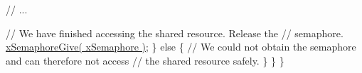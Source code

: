 \begin{DoxyPre}           // ...\end{DoxyPre}



\begin{DoxyPre}           // We have finished accessing the shared resource.  Release the
           // semaphore.
           \hyperlink{vendor_2ceedling_2plugins_2freertos_2src_2freertos_2include_2semphr_8h_aae55761cabfa9bf85c8f4430f78c0953}{xSemaphoreGive( xSemaphore )};
       \}
       else
       \{
           // We could not obtain the semaphore and can therefore not access
           // the shared resource safely.
       \}
   \}
\}
\end{DoxyPre}
 